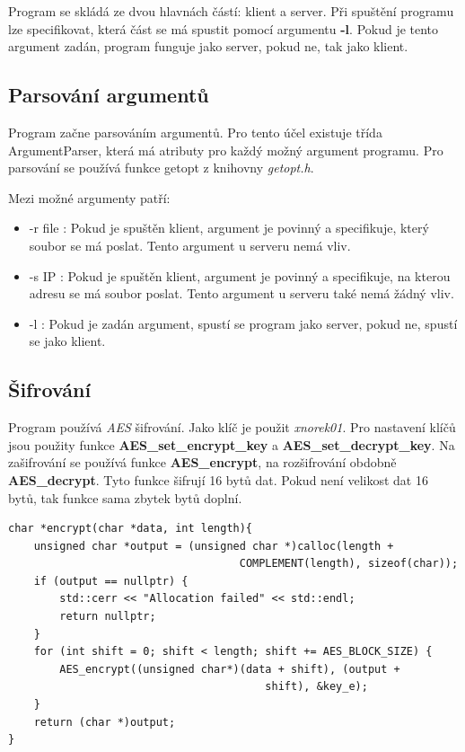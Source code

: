 \documentclass[11pt, a4paper]{article}
\begin{document}
Program se skládá ze dvou hlavnách částí: klient a server. Při spuštění programu lze specifikovat, která část se má spustit pomocí argumentu \textbf{-l}. Pokud je tento argument zadán, program funguje jako server, pokud ne, tak jako klient.

\subsection{Parsování argumentů}
Program začne parsováním argumentů. Pro tento účel existuje třída ArgumentParser, která má atributy pro každý možný argument programu. 
Pro parsování se používá funkce getopt z knihovny \emph{getopt.h}.

\begin{flushleft}
Mezi možné argumenty patří:
\end{flushleft}

 \begin{itemize}
      \item -r file : Pokud je spuštěn klient, argument je povinný a specifikuje, který soubor se má poslat. Tento argument u serveru nemá vliv.
      \item -s IP : Pokud je spuštěn klient, argument je povinný a specifikuje, na kterou adresu se má soubor poslat. Tento argument u serveru také nemá žádný vliv.
      \item -l : Pokud je zadán argument, spustí se program jako server, pokud ne, spustí se jako klient.

\end{itemize}

\subsection{Šifrování}
Program používá \emph{AES} šifrování. Jako klíč je použit \emph{xnorek01}. Pro nastavení klíčů jsou použity funkce \textbf{AES\_set\_encrypt\_key} a \textbf{AES\_set\_decrypt\_key}. Na zašifrování se používá funkce \textbf{AES\_encrypt}, na rozšifrování obdobně \textbf{AES\_decrypt}. Tyto funkce šifrují 16 bytů dat. Pokud není velikost dat 16 bytů, tak funkce sama zbytek bytů doplní. 


\begin{verbatim}
char *encrypt(char *data, int length){
    unsigned char *output = (unsigned char *)calloc(length + 
                                    COMPLEMENT(length), sizeof(char));
    if (output == nullptr) {
        std::cerr << "Allocation failed" << std::endl;
        return nullptr;
    }
    for (int shift = 0; shift < length; shift += AES_BLOCK_SIZE) {
        AES_encrypt((unsigned char*)(data + shift), (output + 
                                        shift), &key_e);
    }
    return (char *)output;
}
\end{verbatim}
\end{document}
